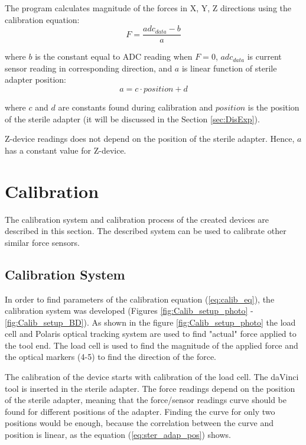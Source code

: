 The program calculates magnitude of the forces in X, Y, Z directions using the calibration equation:
\begin{equation}\label{eq:calib_eq}
F = \frac{adc_{data} - b}{a}
\end{equation}

where $b$ is the constant equal to ADC reading when $F = 0$, $adc_{data}$ is current sensor reading in corresponding direction, and $a$ is linear function of sterile adapter position:
\begin{equation}\label{eq:ster_adap_pos}
a = c \cdot position + d
\end{equation}

where $c$ and $d$ are constants found during calibration and $position$ is the position of the sterile adapter (it will be discussed in the Section \ref{sec:DisExp}).

Z-device readings does not depend on the position of the sterile adapter. Hence, $a$ has a constant value for Z-device.
 
	
\section{Calibration}
\label{section:Calibration}
The calibration system and calibration process of the created devices are described in this section. The described system can be used to calibrate other similar force sensors.

	\subsection{Calibration System}
	\label{sec:CalSetup}
	In order to find parameters of the calibration equation (\ref{eq:calib_eq}), the calibration system was developed (Figures \ref{fig:Calib_setup_photo} - \ref{fig:Calib_setup_BD}). As shown in the figure \ref{fig:Calib_setup_photo} the load cell and Polaris optical tracking system are used to find "actual" force applied to the tool end. The load cell is used to find the magnitude of the applied force and the optical markers (4-5) to find the direction of the force.
	
	The calibration of the device starts with calibration of the load cell. The daVinci tool is inserted in the sterile adapter. The force readings depend on the position of the sterile adapter, meaning that the force/sensor readings curve should be found for different positions of the adapter. Finding the curve for only two positions would be enough, because the correlation between the curve and position is linear, as the equation (\ref{eq:ster_adap_pos}) shows. 


